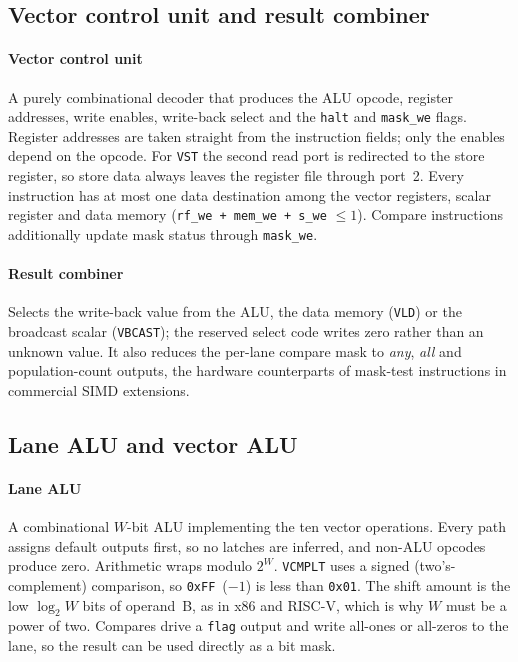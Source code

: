 \documentclass[conference]{IEEEtran}
\begin{document}
\subsection{Vector control unit and result combiner}
\paragraph{Vector control unit} A purely combinational decoder that produces the
ALU opcode, register addresses, write enables, write-back select and the
\texttt{halt} and \texttt{mask\_we} flags. Register addresses are taken straight
from the instruction fields; only the enables depend on the opcode. For
\texttt{VST} the second read port is redirected to the store register, so store
data always leaves the register file through port~2. Every instruction has at
most one data destination among the vector registers, scalar register and data
memory (\texttt{rf\_we + mem\_we + s\_we} $\leq 1$). Compare instructions
additionally update mask status through \texttt{mask\_we}.

\paragraph{Result combiner} Selects the write-back value from the ALU, the data
memory (\texttt{VLD}) or the broadcast scalar (\texttt{VBCAST}); the reserved
select code writes zero rather than an unknown value. It also reduces the
per-lane compare mask to \emph{any}, \emph{all} and population-count outputs,
the hardware counterparts of mask-test instructions in commercial SIMD
extensions.
\subsection{Lane ALU and vector ALU}
\paragraph{Lane ALU} A combinational $W$-bit ALU implementing the ten vector
operations. Every path assigns default outputs first, so no latches are
inferred, and non-ALU opcodes produce zero. Arithmetic wraps modulo $2^W$.
\texttt{VCMPLT} uses a signed (two's-complement) comparison, so
\texttt{0xFF}~($-1$) is less than \texttt{0x01}. The shift amount is the low
$\log_2 W$ bits of operand~B, as in x86 and RISC-V, which is why $W$ must be a
power of two. Compares drive a \texttt{flag} output and write all-ones or
all-zeros to the lane, so the result can be used directly as a bit mask.
\end{document}
